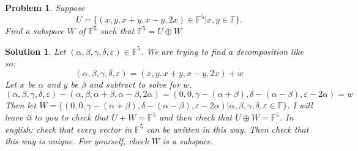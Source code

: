 \documentclass{article}
\theoremstyle{problemstyle}
\newtheorem{problem}{Problem}
\theoremstyle{problemstyle}
\newtheorem{solution}{Solution}
\begin{document}
\begin{problem}
Suppose $$U = \{(x,y,x+y,x-y,2x) \in \mathbb{F}^5 | x,y \in \mathbb{F}\}.$$ Find a subspace $W$ of $\mathbb{F}^5$ such that $\mathbb{F}^5 = U \oplus W$
\end{problem}

\begin{solution}
Let $(\alpha, \beta,\gamma,\delta,\varepsilon) \in \mathbb{F}^5$. We are trying to find a decomposition like so: $$(\alpha, \beta,\gamma,\delta,\varepsilon) = (x,y,x+y,x-y,2x) + w$$
Let $x$ be $\alpha$ and $y$ be $\beta$ and subtract to solve for $w$.  $$(\alpha, \beta,\gamma,\delta,\varepsilon) - (\alpha,\beta,\alpha+\beta,\alpha-\beta,2\alpha) = (0,0,\gamma - (\alpha + \beta), \delta - (\alpha - \beta), \varepsilon - 2\alpha) =  w$$ Then let $W = \{(0,0,\gamma - (\alpha + \beta), \delta - (\alpha - \beta), \varepsilon - 2\alpha) | \alpha, \beta,\gamma,\delta,\varepsilon \in \mathbb{F}\}$. I will leave it to you to check that $U + W = \mathbb{F}^5$ and then check that $U \oplus W = \mathbb{F}^5$. In english: check that every vector in $\mathbb{F}^5$ can be written in this way. Then check that this way is unique.  For yourself, check $W$ is a subspace. 
\end{solution}
\end{document}
